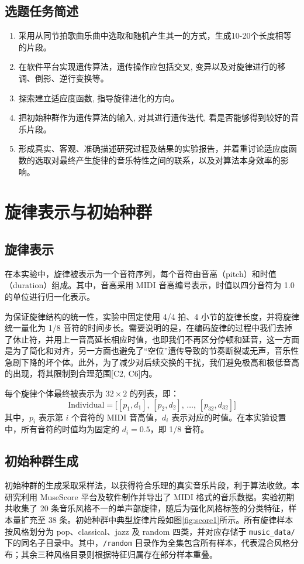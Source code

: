 \documentclass[12pt, a4paper]{ctexart}
\begin{document}
\subsection{选题任务简述}
\begin{enumerate}
    \item 采用从同节拍歌曲乐曲中选取和随机产生其一的方式，生成10-20个长度相等的片段。
    \item 在软件平台实现遗传算法，遗传操作应包括交叉, 变异以及对旋律进行的移调、倒影、逆行变换等。
    \item 探索建立适应度函数, 指导旋律进化的方向。
    \item 把初始种群作为遗传算法的输入, 对其进行遗传迭代, 看是否能够得到较好的音乐片段。
    \item 形成真实、客观、准确描述研究过程及结果的实验报告，并着重讨论适应度函数的选取对最终产生旋律的音乐特性之间的联系，以及对算法本身效率的影响。
\end{enumerate}

\section{旋律表示与初始种群}
\subsection{旋律表示}
在本实验中，旋律被表示为一个音符序列，每个音符由音高（pitch）和时值（duration）组成。其中，音高采用 MIDI 音高编号表示，时值以四分音符为 1.0 的单位进行归一化表示。

为保证旋律结构的统一性，实验中固定使用 4/4 拍、4 小节的旋律长度，并将旋律统一量化为 1/8 音符的时间步长。需要说明的是，在编码旋律的过程中我们去掉了休止符，并用上一音高延长相应时值，也即我们不再区分停顿和延音，这一方面是为了简化和对齐，另一方面也避免了“空位”遗传导致的节奏断裂或无声，音乐性急剧下降的坏个体。此外，为了减少对后续交换的干扰，我们避免极高和极低音高的出现，将其限制到合理范围[C2, C6]内。

每个旋律个体最终被表示为 $32 \times 2$ 的列表，即：
\begin{equation}
\text{Individual} = \big[ [p_1, d_1],\, [p_2, d_2],\, \ldots,\, [p_{32}, d_{32}] \big] \label{eq:format}
\end{equation}
其中，$p_i$ 表示第 $i$ 个音符的 MIDI 音高值，$d_i$ 表示对应的时值。在本实验设置中，所有音符的时值均为固定的 $d_i = 0.5$，即 1/8 音符。

\subsection{初始种群生成}
初始种群的生成采取采样法，以获得符合乐理的真实音乐片段，利于算法收敛。本研究利用 MuseScore 平台及软件制作并导出了 MIDI 格式的音乐数据。实验初期共收集了 20 条音乐风格不一的单声部旋律，随后为强化风格标签的分类特征，样本量扩充至 38 条。初始种群中典型旋律片段如图\ref{fig:score1}所示。所有旋律样本按风格划分为 pop、classical、jazz 及 random 四类，并对应存储于 \verb|music_data/| 下的同名子目录中。其中，\verb|/random| 目录作为全集包含所有样本，代表混合风格分布；其余三种风格目录则根据特征归属存在部分样本重叠。
\end{document}
